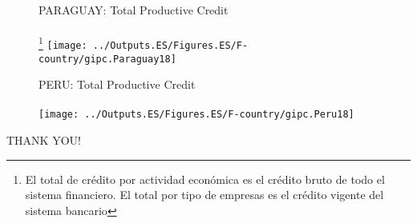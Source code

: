 \documentclass{beamer}
\begin{document}
%
\begin{frame}
	
	\begin{figure}
		\centering
		PARAGUAY: Total Productive Credit\\~\\
		\footnote{El total de crédito por actividad económica es el crédito bruto de todo el sistema financiero. El total por tipo de empresas es el crédito vigente del sistema bancario}
		\texttt{[image: ../Outputs.ES/Figures.ES/F-country/gipc.Paraguay18]}
	\end{figure}
\end{frame}
%
\begin{frame}
	
	\begin{figure}
		\centering
		PERU: Total Productive Credit\\~\\
		\texttt{[image: ../Outputs.ES/Figures.ES/F-country/gipc.Peru18]}
	\end{figure}
\end{frame}
%
	
%

\begin{frame}
	
	THANK YOU!
	
\end{frame}
\end{document}
